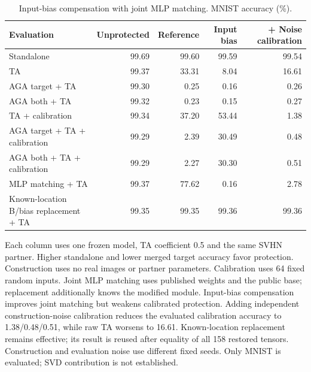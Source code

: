 \begin{table}[t]
\centering\small
\caption{Input-bias compensation with joint MLP matching. MNIST accuracy (\%).}
\label{tab:input-bias-matching}
\begin{tabular}{lrrrr}
\toprule
Evaluation & Unprotected & Reference & Input bias & + Noise calibration \\
\midrule
Standalone & 99.69 & 99.60 & 99.59 & 99.54 \\
TA & 99.37 & 33.31 & 8.04 & 16.61 \\
AGA target + TA & 99.30 & 0.25 & 0.16 & 0.26 \\
AGA both + TA & 99.32 & 0.23 & 0.15 & 0.27 \\
TA + calibration & 99.34 & 37.20 & 53.44 & 1.38 \\
AGA target + TA + calibration & 99.29 & 2.39 & 30.49 & 0.48 \\
AGA both + TA + calibration & 99.29 & 2.27 & 30.30 & 0.51 \\
MLP matching + TA & 99.37 & 77.62 & 0.16 & 2.78 \\
Known-location B/bias replacement + TA & 99.35 & 99.35 & 99.36 & 99.36 \\
\bottomrule
\end{tabular}
\par\smallskip
\begin{minipage}{\textwidth}\footnotesize
Each column uses one frozen model, TA coefficient 0.5 and the same SVHN partner. Higher standalone and lower merged target accuracy favor protection. Construction uses no real images or partner parameters. Calibration uses 64 fixed random inputs. Joint MLP matching uses published weights and the public base; replacement additionally knows the modified module. Input-bias compensation improves joint matching but weakens calibrated protection. Adding independent construction-noise calibration reduces the evaluated calibration accuracy to 1.38/0.48/0.51, while raw TA worsens to 16.61. Known-location replacement remains effective; its result is reused after equality of all 158 restored tensors. Construction and evaluation noise use different fixed seeds. Only MNIST is evaluated; SVD contribution is not established.\end{minipage}
\end{table}


